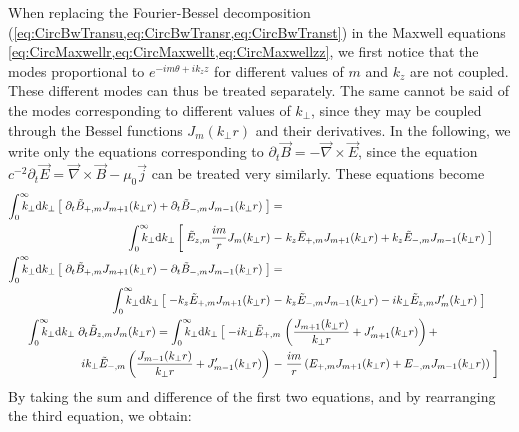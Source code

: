 When replacing the Fourier-Bessel decomposition
(\cref{eq:CircBwTransu,eq:CircBwTransr,eq:CircBwTranst}) in the
Maxwell equations \cref{eq:CircMaxwellr,eq:CircMaxwellt,eq:CircMaxwellzz}, we
first notice that the modes proportional to $e^{-im\theta +ik_z z}$ for different
values of $m$ and $k_z$ are not coupled. These different modes can
thus be treated separately. The same cannot be said of the modes
corresponding to different values of $k_\perp $, since they may be coupled
through the Bessel functions $J_m(k_\perp r)$ and their derivatives. 
In the following, we write only the equations corresponding to $\partial_t \vec{B} =
-\vec{\nabla}\times \vec{E}$, since the equation $c^{-2}\partial_t \vec{E} =
\vec{\nabla}\times\vec{B} - \mu_0 \vec{j}$ can be treated very
similarly. These equations become
\begin{align*}
\RInteg{k_\perp } \left[ \; \partial_t \tilde{B}_{+,m}  J_{m+1}(k_\perp r)
  + \partial_t \tilde{B}_{-,m}  J_{m-1}(k_\perp r) \; \right] =&& \\ 
\qquad \RInteg{k_\perp } \left[ \; \tilde{E}_{z,m} \frac{im}{r}
  J_m(k_\perp r) \right.-&\left.
  k_z\tilde{E}_{+,m}J_{m+1}(k_\perp r) + k_z\tilde{E}_{-,m}J_{m-1}(k_\perp r) \;
\right] & \\
\RInteg{k_\perp } \left[ \; \partial_t \tilde{B}_{+,m}  J_{m+1}(k_\perp r)
  - \partial_t \tilde{B}_{-,m}  J_{m-1}(k_\perp r) \; \right] =&& \\
 \RInteg{k_\perp } \left[ \; -k_z\tilde{E}_{+,m}J_{m+1}(k_\perp r)
 \right.-&\left.  k_z\tilde{E}_{-,m}J_{m-1}(k_\perp r) - ik_\perp \tilde{E}_{z,m} J_m'(k_\perp r) \;\right] \\
\RInteg{k_\perp }\; \partial_t \tilde{B}_{z,m}  J_{m}(k_\perp r) =
\RInteg{k_\perp } \left[ \; -ik_\perp
  \tilde{E}_{+,m}\right.&\left(\frac{J_{m+1}(k_\perp r)}{k_\perp r} +
    J_{m+1}'(k_\perp r) \right) + &\\
\left. ik_\perp \tilde{E}_{-,m}\left(\frac{J_{m-1}(k_\perp r)}{k_\perp r} +
    J_{m-1}'(k_\perp r) \right) \right.-&\left. \frac{im}{r} \left( E_{+,m} J_{m+1}(k_\perp r) +
    E_{-,m} J_{m-1}(k_\perp r) \right) \;\right] 
\end{align*}
By taking the sum and difference of the first two equations, and by
rearranging the third equation, we obtain:

